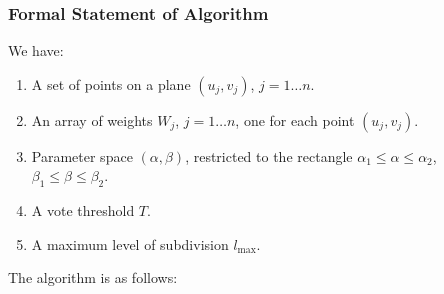  \subsubsection{Formal Statement of Algorithm}
  We have:
  \begin{enumerate}
   \item A set of points on a plane $(u_j,v_j)$, $j=1 \ldots n$.

   \item An array of weights $W_j$, $j=1 \ldots n$, one for each
	 point $(u_j,v_j)$.

   \item Parameter space $(\alpha,\beta)$, restricted to the rectangle
	 $\alpha_1 \leq \alpha \leq \alpha_2$,
	 $\beta_1 \leq \beta \leq \beta_2$.

   \item A vote threshold $T$.

   \item A maximum level of subdivision $l_{\max}$.
  \end{enumerate}
  The algorithm is as follows:


